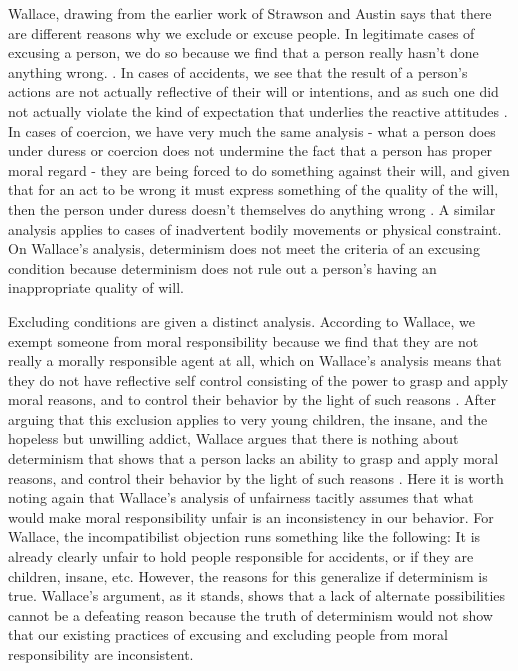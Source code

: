 \documentclass[phd,12pt,oneside,paper=letterpaper]{ubcthesis}
\begin{document}
Wallace, drawing from the earlier work of Strawson and Austin says that there are different reasons why we exclude or excuse people. In legitimate cases of excusing a person, we do so because we find that a person really hasn't done anything wrong. \citep[p.119]{wallace1994}. In cases of accidents, we see that the result of a person's actions are not actually reflective of their will or intentions, and as such one did not actually violate the kind of expectation that underlies the reactive attitudes \citep[p.136-9]{wallace1994}. In cases of coercion, we have very much the same analysis - what a person does under duress or coercion does not undermine the fact that a person has proper moral regard - they are being forced to do something against their will, and given that for an act to be wrong it must express something of the quality of the will, then the person under duress doesn't themselves do anything wrong \citep[p.143-7]{wallace1994}. A similar analysis applies to cases of inadvertent bodily movements or physical constraint. On Wallace's analysis, determinism does not meet the criteria of an excusing condition because determinism does not rule out a person's having an inappropriate quality of will.

Excluding conditions are given a distinct analysis. According to Wallace, we exempt someone from moral responsibility because we find that they are not really a morally responsible agent at all, which on Wallace's analysis means that they do not have reflective self control consisting of the power to grasp and apply moral reasons, and to control their behavior by the light of such reasons \citep[p.156-7]{wallace1994}. After arguing that this exclusion applies to very young children, the insane, and the hopeless but unwilling addict, Wallace argues that there is nothing about determinism that shows that a person lacks an ability to grasp and apply moral reasons, and control their behavior by the light of such reasons \citep[p.180-2]{wallace1994}.
Here it is worth noting again that Wallace's analysis of unfairness tacitly assumes that what would make moral responsibility unfair is an inconsistency in our behavior. For Wallace, the incompatibilist objection runs something like the following: It is already clearly unfair to hold people responsible for accidents, or if they are children, insane, etc. However, the reasons for this generalize if determinism is true. Wallace's argument, as it stands, shows that a lack of alternate possibilities cannot be a defeating reason because the truth of determinism would not show that our existing practices of excusing and excluding people from moral responsibility are inconsistent. 
\end{document}
